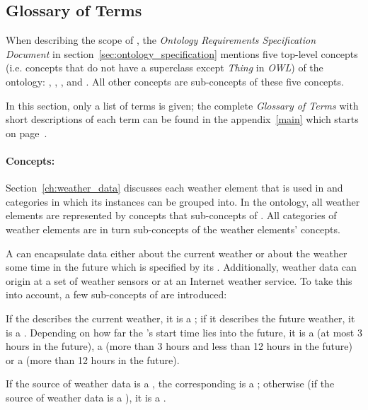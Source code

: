 \subsection{Glossary of Terms}
\label{sec:ontology_glossary}

When describing the scope of \thinkhomeweather, the \emph{Ontology Requirements Specification Document} in section~\ref{sec:ontology_specification} mentions five top-level concepts (i.e. concepts that do not have a superclass except \emph{Thing} in \emph{OWL}) of the ontology: , , , and . All other concepts are sub-concepts of these five concepts.

In this section, only a list of terms is given; the complete \emph{Glossary of Terms} with short descriptions of each term can be found in the appendix~\ref{main} which starts on page~\pageref{main}.

\paragraph{Concepts:}

Section~\ref{ch:weather_data} discusses each weather element that is used in \thinkhomeweather and categories in which its instances can be grouped into. In the ontology, all weather elements are represented by concepts that sub-concepts of . All categories of weather elements are in turn sub-concepts of the weather elements' concepts.

A  can encapsulate data either about the current weather or about the weather some time in the future which is specified by its . Additionally, weather data can origin at a set of weather sensors or at an Internet weather service. To take this into account, a few sub-concepts of  are introduced:

If the  describes the current weather, it is a ; if it describes the future weather, it is a . Depending on how far the 's start time lies into the future, it is a  (at most 3 hours in the future), a  (more than 3 hours and less than 12 hours in the future) or a  (more than 12 hours in the future).

If the source of weather data is a , the corresponding  is a ; otherwise (if the source of weather data is a ), it is a .

